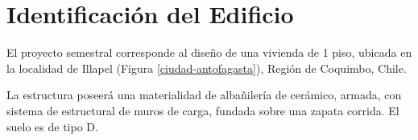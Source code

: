 \section {Identificación del Edificio}

El proyecto semestral corresponde al diseño de una vivienda de 1 piso, ubicada en la localidad de Illapel (Figura \ref{ciudad-antofagasta}), Región de Coquimbo, Chile.


La estructura poseerá una materialidad de albañilería de cerámico, armada, con sistema de estructural de muros de carga, fundada sobre una zapata corrida. El suelo es de tipo D.